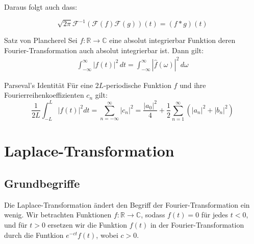 \documentclass[a4paper,10pt]{article}
\begin{document}
Daraus folgt auch dass:

\begin{equation*}
  \sqrt{2\pi}\mathcal{F}^{-1}(\mathcal{F}(f)\mathcal{F}(g))(t)=(f*g)(t)
\end{equation*}

\begin{subbox}{Satz von Plancherel}
  Sei \(f\colon\mathbb{R}\to\mathbb{C}\) eine absolut integrierbar Funktion deren Fourier-Transformation auch absolut integrierbar ist. Dann gilt: \begin{align*} \int_{-\infty}^{\infty} |f(t)|^2 \,dt = \int_{-\infty}^{\infty} |\hat{f}(\omega )|^2\,d\omega \end{align*}
\end{subbox}

\begin{subbox}{Parseval's Identität}
  Für eine $2L$-periodische Funktion $f$ und ihre Fourierreihenkoeffizienten $c_n$ gilt:
  $$
    \frac{1}{2L} \int_{-L}^L |f(t)|^2 dt = \sum_{n = -\infty}^\infty | c_n |^2 = \frac{|a_0|^2}{4} + \frac12 \sum_{n=1}^\infty \left( |a_n|^2 +|b_n|^2 \right)
  $$
\end{subbox}

\section{Laplace-Transformation}

\subsection{Grundbegriffe}

Die Laplace-Transformation ändert den Begriff der Fourier-Transformation ein wenig. Wir betrachten Funktionen \(f\colon\mathbb{R}\to\mathbb{C}\), sodass \(f(t)=0\) für jedes \(t<0\), und für \(t>0\) ersetzen wir die Funktion \(f(t)\) in der Fourier-Transformation durch die Funtkion \(e^{-ct}f(t)\), wobei \(c>0\).
\end{document}
